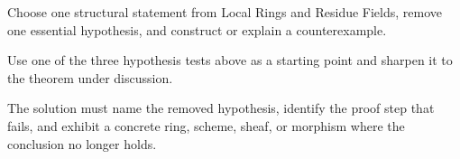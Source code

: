 \begin{exercise}\label{exr:vi11-expand-16}
Choose one structural statement from Local Rings and Residue Fields, remove one essential hypothesis, and construct or explain a counterexample.
\end{exercise}
\begin{hint}
Use one of the three hypothesis tests above as a starting point and sharpen it to the theorem under discussion.
\end{hint}
\begin{solution}
The solution must name the removed hypothesis, identify the proof step that fails, and exhibit a concrete ring, scheme, sheaf, or morphism where the conclusion no longer holds.
\end{solution}

